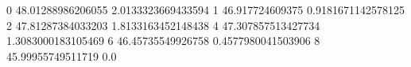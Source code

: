 0 48.01288986206055 2.0133323669433594
1 46.917724609375 0.9181671142578125
2 47.81287384033203 1.8133163452148438
4 47.307857513427734 1.3083000183105469
6 46.45735549926758 0.4577980041503906
8 45.99955749511719 0.0
